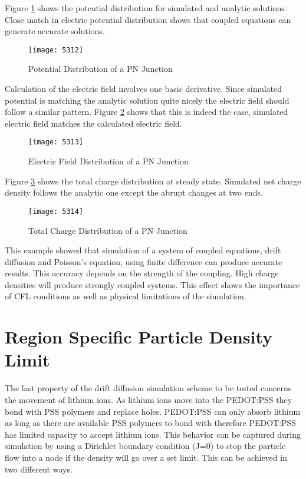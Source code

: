 \begin{doublespace}
 Figure \ref{pnpot} shows the potential distribution for simulated and analytic solutions. Close match in electric potential distribution shows that coupled equations can generate accurate solutions.
 
\begin{figure}[!htp]
\centering
\texttt{[image: 5312]}
\caption{Potential Distribution of a PN Junction} 
\label{pnpot}
\end{figure}

Calculation of the electric field involves one basic derivative. Since simulated potential is matching the analytic solution quite nicely the electric field should follow a similar pattern. Figure \ref{pnefield} shows that this is indeed the case, simulated electric field matches the calculated electric field.
\begin{figure}[!htp]
\centering
\texttt{[image: 5313]}
\caption{Electric Field Distribution of a PN Junction} 
\label{pnefield}
\end{figure}

Figure \ref{pncd} shows the total charge distribution at steady state. Simulated net charge density follows the analytic one except the abrupt changes at two ends. 
\begin{figure}
\centering
\texttt{[image: 5314]}
\caption{Total Charge Distribution of a PN Junction} 
\label{pncd}
\end{figure}

This example showed that simulation of a system of coupled equations, drift diffusion and Poisson's equation, using finite difference can produce accurate results. This accuracy depends on the strength of the coupling. High charge densities will produce strongly coupled systems. This effect shows the importance of CFL conditions as well as physical limitations of the simulation.


\clearpage
\section{Region Specific Particle Density Limit}

The last property of the drift diffusion simulation scheme to be tested concerns the movement of lithium ions. As lithium ions move into the PEDOT:PSS they bond with PSS polymers and replace holes. PEDOT:PSS can only absorb lithium as long as there are available PSS polymers to bond with therefore PEDOT:PSS has limited capacity to accept lithium ions. This behavior can be captured during simulation by using a Dirichlet boundary condition (J=0) to stop the particle flow into a node if the density will go over a set limit. This can be achieved in two different ways. 


\end{doublespace}
